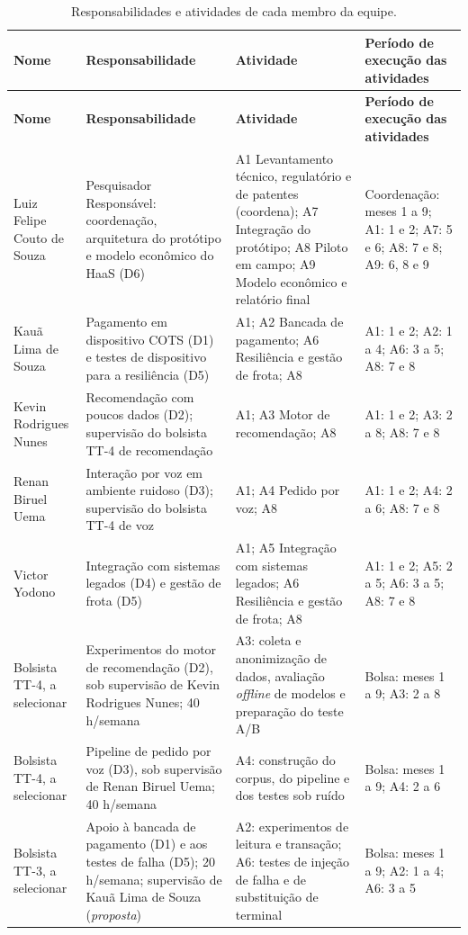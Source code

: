 \documentclass[12pt,a4paper]{article}
\newcommand{\tablefont}{\footnotesize\setstretch{1.05}}
\newcommand{\hd}{\rowcolor{fapesplight}}
\begin{document}
{\tablefont
\begin{xltabular}{\linewidth}{|L{2.6cm}|Y|L{4.1cm}|L{3.7cm}|}
\caption{Responsabilidades e atividades de cada membro da equipe.}\label{tab:equipe}\\
\hline\hd
\textbf{Nome} & \textbf{Responsabilidade} & \textbf{Atividade} & \textbf{Período de execução das atividades}\\\hline
\endfirsthead
\hline\hd
\textbf{Nome} & \textbf{Responsabilidade} & \textbf{Atividade} & \textbf{Período de execução das atividades}\\\hline
\endhead
Luiz Felipe Couto de Souza & Pesquisador Responsável: coordenação, arquitetura do protótipo e modelo econômico do HaaS (D6) & A1 Levantamento técnico, regulatório e de patentes (coordena); A7 Integração do protótipo; A8 Piloto em campo; A9 Modelo econômico e relatório final & Coordenação: meses 1 a 9; A1: 1 e 2; A7: 5 e 6; A8: 7 e 8; A9: 6, 8 e 9\\\hline
Kauã Lima de Souza & Pagamento em dispositivo COTS (D1) e testes de dispositivo para a resiliência (D5) & A1; A2 Bancada de pagamento; A6 Resiliência e gestão de frota; A8 & A1: 1 e 2; A2: 1 a 4; A6: 3 a 5; A8: 7 e 8\\\hline
Kevin Rodrigues Nunes & Recomendação com poucos dados (D2); supervisão do bolsista TT-4 de recomendação & A1; A3 Motor de recomendação; A8 & A1: 1 e 2; A3: 2 a 8; A8: 7 e 8\\\hline
Renan Biruel Uema & Interação por voz em ambiente ruidoso (D3); supervisão do bolsista TT-4 de voz & A1; A4 Pedido por voz; A8 & A1: 1 e 2; A4: 2 a 6; A8: 7 e 8\\\hline
Victor Yodono & Integração com sistemas legados (D4) e gestão de frota (D5) & A1; A5 Integração com sistemas legados; A6 Resiliência e gestão de frota; A8 & A1: 1 e 2; A5: 2 a 5; A6: 3 a 5; A8: 7 e 8\\\hline
Bolsista TT-4, a selecionar & Experimentos do motor de recomendação (D2), sob supervisão de Kevin Rodrigues Nunes; 40 h/semana & A3: coleta e anonimização de dados, avaliação \textit{offline} de modelos e preparação do teste A/B & Bolsa: meses 1 a 9; A3: 2 a 8\\\hline
Bolsista TT-4, a selecionar & Pipeline de pedido por voz (D3), sob supervisão de Renan Biruel Uema; 40 h/semana & A4: construção do corpus, do pipeline e dos testes sob ruído & Bolsa: meses 1 a 9; A4: 2 a 6\\\hline
Bolsista TT-3, a selecionar & Apoio à bancada de pagamento (D1) e aos testes de falha (D5); 20 h/semana; supervisão de Kauã Lima de Souza (\textit{proposta}) & A2: experimentos de leitura e transação; A6: testes de injeção de falha e de substituição de terminal & Bolsa: meses 1 a 9; A2: 1 a 4; A6: 3 a 5\\\hline
\end{xltabular}}
\end{document}
